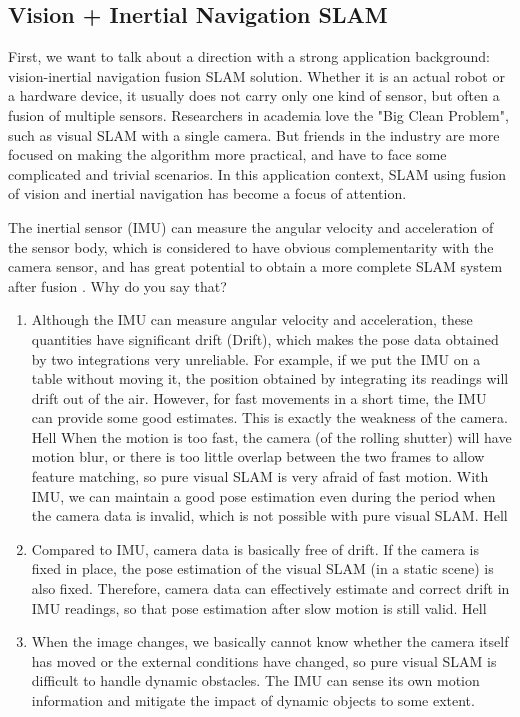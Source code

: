 \subsection{Vision + Inertial Navigation SLAM}

First, we want to talk about a direction with a strong application background: vision-inertial navigation fusion SLAM solution. Whether it is an actual robot or a hardware device, it usually does not carry only one kind of sensor, but often a fusion of multiple sensors. Researchers in academia love the "Big Clean Problem", such as visual SLAM with a single camera. But friends in the industry are more focused on making the algorithm more practical, and have to face some complicated and trivial scenarios. In this application context, SLAM using fusion of vision and inertial navigation has become a focus of attention.

The inertial sensor (IMU) can measure the angular velocity and acceleration of the sensor body, which is considered to have obvious complementarity with the camera sensor, and has great potential to obtain a more complete SLAM system after fusion \textsuperscript{\cite{Gui2015}}. Why do you say that?

\begin{enumerate}
\item Although the IMU can measure angular velocity and acceleration, these quantities have significant drift (Drift), which makes the pose data obtained by two integrations very unreliable. For example, if we put the IMU on a table without moving it, the position obtained by integrating its readings will drift out of the air. However, for fast movements in a short time, the IMU can provide some good estimates. This is exactly the weakness of the camera.
Hell
\clearpage
\hspace{2em} When the motion is too fast, the camera (of the rolling shutter) will have motion blur, or there is too little overlap between the two frames to allow feature matching, so pure visual SLAM is very afraid of fast motion. With IMU, we can maintain a good pose estimation even during the period when the camera data is invalid, which is not possible with pure visual SLAM.
Hell
\item Compared to IMU, camera data is basically free of drift. If the camera is fixed in place, the pose estimation of the visual SLAM (in a static scene) is also fixed. Therefore, camera data can effectively estimate and correct drift in IMU readings, so that pose estimation after slow motion is still valid.
Hell
\item When the image changes, we basically cannot know whether the camera itself has moved or the external conditions have changed, so pure visual SLAM is difficult to handle dynamic obstacles. The IMU can sense its own motion information and mitigate the impact of dynamic objects to some extent.
\end{enumerate}

